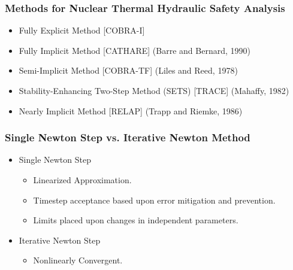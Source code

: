 \documentclass[compress,xcolor=table]{beamer}
\begin{document}
\begin{frame}
\frametitle{Methods for Nuclear Thermal Hydraulic Safety Analysis}

\begin{itemize}
\item{Fully Explicit Method [COBRA-I]}
\item{Fully Implicit Method [CATHARE] (Barre and Bernard, 1990)}
\item{Semi-Implicit Method [COBRA-TF] (Liles and Reed, 1978) }
\item{Stability-Enhancing Two-Step Method (SETS) [TRACE] (Mahaffy, 1982) }
\item{Nearly Implicit Method [RELAP] (Trapp and Riemke, 1986) }
\end{itemize}

\end{frame}
\begin{frame}
\frametitle{Single Newton Step vs. Iterative Newton Method}

\begin{itemize}
\item{Single Newton Step
\begin{itemize}
\item{Linearized Approximation.}
\item{Timestep acceptance based upon error mitigation and prevention.}
\item{Limits placed upon changes in independent parameters.}
\end{itemize}
}
\item{Iterative Newton Step
\begin{itemize}
\item{Nonlinearly Convergent.}
\end{itemize}
}
\end{itemize}

\begin{figure}[t]
\centering
\resizebox{1.0\textwidth}{!}{

}
\end{figure}

\end{frame}
\end{document}
